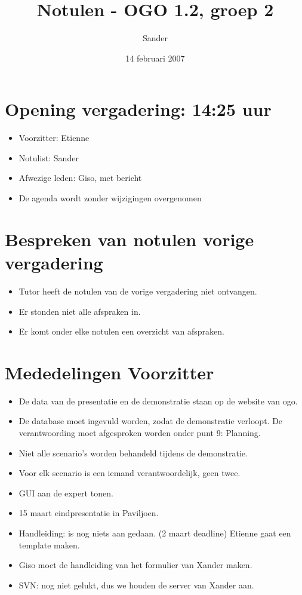 \documentclass[]{article}
\title{Notulen - OGO 1.2, groep 2}
\author{ Sander \\ }
\date{14 februari 2007}
\begin{document}
\ifpdf
{}
\else
{}
\fi

\maketitle


\section{Opening vergadering: 14:25 uur }
  \begin{itemize}
    \item Voorzitter: Etienne
    \item Notulist: Sander
    \item Afwezige leden: Giso, met bericht
    \item De agenda wordt zonder wijzigingen overgenomen
  \end{itemize}


\section{Bespreken van notulen vorige vergadering}
  \begin{itemize}
     \item Tutor heeft de notulen van de vorige vergadering niet
     ontvangen.
     \item Er stonden niet alle afspraken in.
     \item Er komt onder elke notulen een overzicht van afspraken.
  \end{itemize}

\section{Mededelingen Voorzitter}

  \begin{itemize}
     \item De data van de presentatie en de demonstratie staan op de
     website van ogo.
     \item De database moet ingevuld worden, zodat de demonstratie
     verloopt. De verantwoording moet afgesproken worden onder punt
     9: Planning.
     \item Niet alle scenario's worden behandeld tijdens de
     demonstratie.
     \item Voor elk scenario is een iemand verantwoordelijk, geen
     twee.
     \item GUI aan de expert tonen.
     \item 15 maart eindpresentatie in Paviljoen.
     \item Handleiding: is nog niets aan gedaan. (2 maart deadline) Etienne gaat een template maken.
     \item Giso moet de handleiding van het formulier van Xander maken.
     \item SVN: nog niet gelukt, dus we houden de server van Xander aan.
  \end{itemize}
\end{document}
